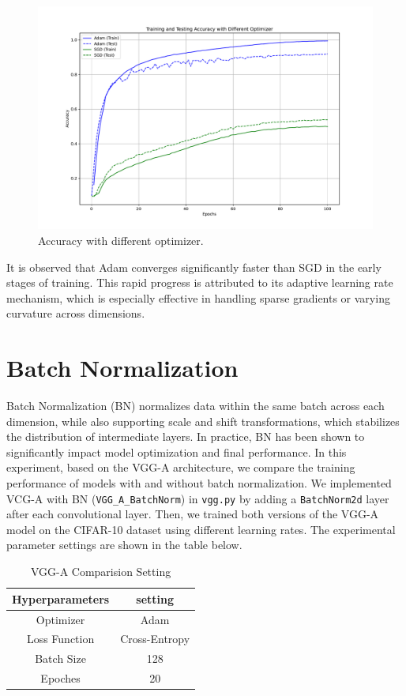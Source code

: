 \documentclass{article}
\begin{document}
\begin{figure}[H]
  \centering
  \includegraphics[width=0.7\linewidth]{figures/accuracy_different_optimizer.pdf}
  \caption{Accuracy with different optimizer.}
  \label{fig:accuracy_different_optimizer}
\end{figure}

It is observed that Adam converges significantly faster than SGD in the early stages of training. This rapid progress is attributed to its adaptive learning rate mechanism, which is especially effective in handling sparse gradients or varying curvature across dimensions.

\section{Batch Normalization}

Batch Normalization (BN) normalizes data within the same batch across each dimension, while also supporting scale and shift transformations, which stabilizes the distribution of intermediate layers. In practice, BN has been shown to significantly impact model optimization and final performance. In this experiment, based on the VGG-A architecture, we compare the training performance of models with and without batch normalization. We implemented VCG-A with BN (\texttt{VGG\_A\_BatchNorm}) in \texttt{vgg.py} by adding a \texttt{BatchNorm2d} layer after each convolutional layer. Then, we trained both versions of the VGG-A model on the CIFAR-10 dataset using different learning rates. The experimental parameter settings are shown in the table below.

\begin{table}[H]
\centering
\caption{VGG-A Comparision Setting}
\label{tab:vgg_bn_settings}
\begin{tabular}{cc}
\toprule
\textbf{Hyperparameters} & \textbf{setting} \\
\midrule
Optimizer & Adam \\
Loss Function & Cross-Entropy \\
Batch Size & 128 \\
Epoches & 20 \\
\bottomrule
\end{tabular}
\end{table}
\end{document}
